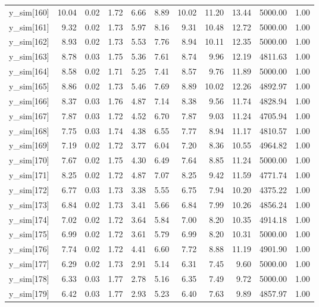 \begin{table}[ht]
\begin{tabular}{rrrrrrrrrrr}
  y\_sim[160] & 10.04 & 0.02 & 1.72 & 6.66 & 8.89 & 10.02 & 11.20 & 13.44 & 5000.00 & 1.00 \\ 
  y\_sim[161] & 9.32 & 0.02 & 1.73 & 5.97 & 8.16 & 9.31 & 10.48 & 12.72 & 5000.00 & 1.00 \\ 
  y\_sim[162] & 8.93 & 0.02 & 1.73 & 5.53 & 7.76 & 8.94 & 10.11 & 12.35 & 5000.00 & 1.00 \\ 
  y\_sim[163] & 8.78 & 0.03 & 1.75 & 5.36 & 7.61 & 8.74 & 9.96 & 12.19 & 4811.63 & 1.00 \\ 
  y\_sim[164] & 8.58 & 0.02 & 1.71 & 5.25 & 7.41 & 8.57 & 9.76 & 11.89 & 5000.00 & 1.00 \\ 
  y\_sim[165] & 8.86 & 0.02 & 1.73 & 5.46 & 7.69 & 8.89 & 10.02 & 12.26 & 4892.97 & 1.00 \\ 
  y\_sim[166] & 8.37 & 0.03 & 1.76 & 4.87 & 7.14 & 8.38 & 9.56 & 11.74 & 4828.94 & 1.00 \\ 
  y\_sim[167] & 7.87 & 0.03 & 1.72 & 4.52 & 6.70 & 7.87 & 9.03 & 11.24 & 4705.94 & 1.00 \\ 
  y\_sim[168] & 7.75 & 0.03 & 1.74 & 4.38 & 6.55 & 7.77 & 8.94 & 11.17 & 4810.57 & 1.00 \\ 
  y\_sim[169] & 7.19 & 0.02 & 1.72 & 3.77 & 6.04 & 7.20 & 8.36 & 10.55 & 4964.82 & 1.00 \\ 
  y\_sim[170] & 7.67 & 0.02 & 1.75 & 4.30 & 6.49 & 7.64 & 8.85 & 11.24 & 5000.00 & 1.00 \\ 
  y\_sim[171] & 8.25 & 0.02 & 1.72 & 4.87 & 7.07 & 8.25 & 9.42 & 11.59 & 4771.74 & 1.00 \\ 
  y\_sim[172] & 6.77 & 0.03 & 1.73 & 3.38 & 5.55 & 6.75 & 7.94 & 10.20 & 4375.22 & 1.00 \\ 
  y\_sim[173] & 6.84 & 0.02 & 1.73 & 3.41 & 5.66 & 6.84 & 7.99 & 10.26 & 4856.24 & 1.00 \\ 
  y\_sim[174] & 7.02 & 0.02 & 1.72 & 3.64 & 5.84 & 7.00 & 8.20 & 10.35 & 4914.18 & 1.00 \\ 
  y\_sim[175] & 6.99 & 0.02 & 1.72 & 3.61 & 5.79 & 6.99 & 8.20 & 10.31 & 5000.00 & 1.00 \\ 
  y\_sim[176] & 7.74 & 0.02 & 1.72 & 4.41 & 6.60 & 7.72 & 8.88 & 11.19 & 4901.90 & 1.00 \\ 
  y\_sim[177] & 6.29 & 0.02 & 1.73 & 2.91 & 5.14 & 6.31 & 7.45 & 9.60 & 5000.00 & 1.00 \\ 
  y\_sim[178] & 6.33 & 0.03 & 1.77 & 2.78 & 5.16 & 6.35 & 7.49 & 9.72 & 5000.00 & 1.00 \\ 
  y\_sim[179] & 6.42 & 0.03 & 1.77 & 2.93 & 5.23 & 6.40 & 7.63 & 9.89 & 4857.97 & 1.00 \\ 

\end{tabular}
\end{table}
